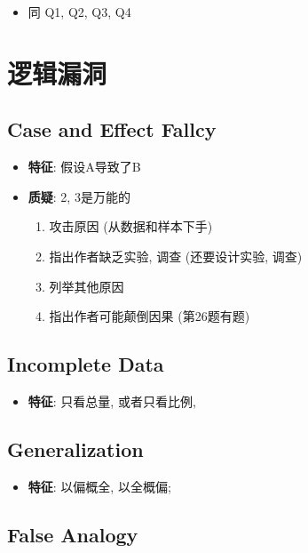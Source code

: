     \begin{itemize}
      \item 同 Q1, Q2, Q3, Q4
    \end{itemize}

\section{逻辑漏洞}

  \subsection{Case and Effect Fallcy}

    \begin{itemize}
      \item \textbf{特征}: 假设A导致了B
      \item \textbf{质疑}: 2, 3是万能的
      \begin{enumerate}
        \item 攻击原因 (从数据和样本下手)
        \item 指出作者缺乏实验, 调查 (还要设计实验, 调查)
        \item 列举其他原因
        \item 指出作者可能颠倒因果 (第26题有题)
      \end{enumerate}
    \end{itemize}

  \subsection{Incomplete Data}

    \begin{itemize}
      \item \textbf{特征}: 只看总量, 或者只看比例, 
    \end{itemize}

  \subsection{Generalization}

    \begin{itemize}
      \item \textbf{特征}: 以偏概全, 以全概偏;
    \end{itemize}

  \subsection{False Analogy}

